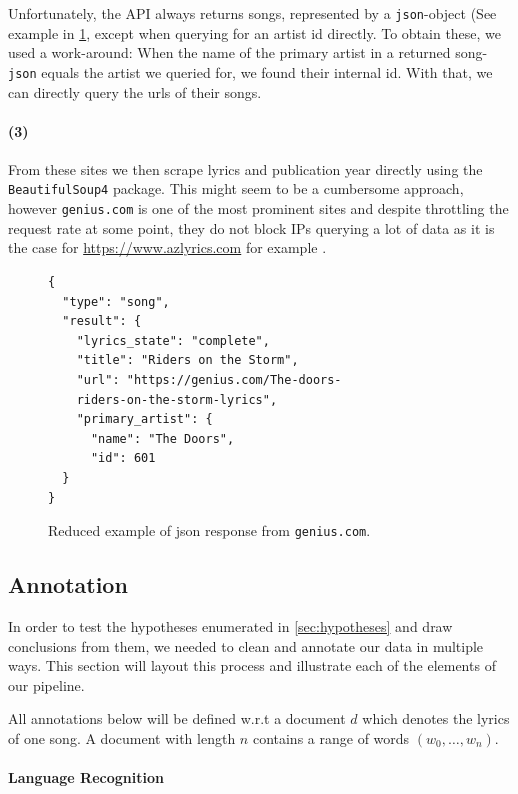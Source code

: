 \documentclass[11pt,a4paper]{article}
\begin{document}
Unfortunately, the API always returns songs, represented by a \texttt{json}-object (See example in \cref{fig:jsonsample}, except when querying for an artist id directly. To obtain these, we used a work-around: When the name of the primary artist in a returned song-\texttt{json} equals the artist we queried for, we found their internal id. With that, we can directly query the urls of their songs. 

\paragraph{(3)} From these sites we then scrape lyrics and publication year directly using the \texttt{BeautifulSoup4} package. This might seem to be a cumbersome approach, however \texttt{genius.com} is one of the most prominent sites and despite throttling the request rate at some point, they do not block IPs querying a lot of data as it is the case for \url{https://www.azlyrics.com} for example \citep{guarneri_banned_2013}. 
\begin{figure}
	\centering
	\footnotesize
	\begin{verbatim}
{
  "type": "song",
  "result": {
    "lyrics_state": "complete",
    "title": "Riders on the Storm",
    "url": "https://genius.com/The-doors-
    riders-on-the-storm-lyrics",
    "primary_artist": {
      "name": "The Doors",
      "id": 601
  }
}
	\end{verbatim}
	\label{fig:jsonsample}
	\caption{Reduced example of json response from \texttt{genius.com}.}
\end{figure}
\subsection{Annotation}\label{sec:annotations}

In order to test the hypotheses enumerated in \cref{sec:hypotheses} and draw conclusions from them, we needed to clean and annotate our data in multiple ways. This section will layout this process and illustrate each of the elements of our pipeline. 

All annotations below will be defined w.r.t a document $d$ which denotes the lyrics of one song. A document with length $n$ contains a range of words $(w_0, \ldots, w_n)$. 

\paragraph{Language Recognition}
\end{document}
